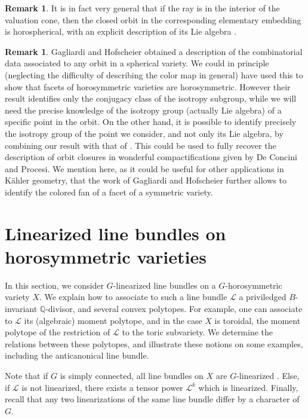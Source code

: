 \documentclass{amsart}
\theoremstyle{definition}
\newtheorem{rem}[thm]{Remark}
\begin{document}
\begin{rem}
It is in fact very general that if the ray is in the 
interior of the valuation cone, then the closed orbit in the corresponding 
elementary embedding is horospherical, with an explicit description of its 
Lie algebra \cite[Proposition 3.10]{BP87}.
\end{rem}

\begin{rem}
Gagliardi and Hofscheier \cite{GH15_hsd} obtained a description of the combinatorial 
data associated to any orbit in a spherical variety. We could in principle 
(neglecting the difficulty of describing the color map in general) have 
used this to show that facets of horosymmetric varieties are horosymmetric. 
However their result identifies only the conjugacy class of the isotropy subgroup, 
while we will need the precise knowledge of the isotropy group (actually Lie algebra)
of a specific point in the orbit. On the other hand, it is possible to identify 
precisely the isotropy group of the point we consider, and not only its Lie algebra, 
by combining our result with that of \cite{GH15_hsd}. 
This could be used to fully recover the description of orbit closures in 
wonderful compactifications given by De Concini and Procesi. 
We mention here, as it could be useful for other applications in Kähler geometry, 
that the work of Gagliardi and Hofscheier \cite{GH15_hsd} further allows to identify 
the colored fan of a facet of a symmetric variety. 
\end{rem}

\section{Linearized line bundles on horosymmetric varieties}

\label{sec_bundles}

In this section, we consider $G$-linearized line bundles on a 
$G$-horosymmetric variety $X$. We explain how to associate to 
such a line bundle $\mathcal{L}$ a priviledged $B$-invariant 
$\mathbb{Q}$-divisor, and several convex polytopes. 
For example, one can associate to $\mathcal{L}$ its (algebraic) 
moment polytope, and in the case $X$ is toroidal, the moment 
polytope of the restriction of $\mathcal{L}$ to the toric subvariety. 
We determine the relations between these polytopes, and illustrate 
these notions on some examples, including the anticanonical line bundle.

Note that if $G$ is simply connected, all line bundles on $X$ are 
$G$-linearized \cite{KKV89,KKLV89}. 
Else, if $\mathcal{L}$ is not linearized, there exists 
a tensor power $\mathcal{L}^k$ which is linearized. Finally, recall 
that any two linearizations of the same line bundle differ by a character 
of $G$.
\end{document}
